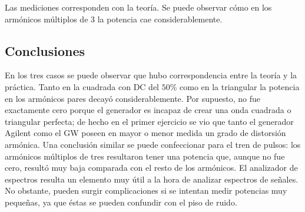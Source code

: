 Las mediciones corresponden con la teoría. Se puede observar cómo en los armónicos múltiplos de $3$ la potencia cae considerablemente.

\subsection{Conclusiones}

En los tres casos se puede observar que hubo correspondencia entre la teoría y la práctica. Tanto en la cuadrada con DC del $50\%$ como en la triangular la potencia en los armónicos pares decayó considerablemente. Por supuesto, no fue exactamente cero porque el generador es incapaz de crear una onda cuadrada o triangular perfecta; de hecho en el primer ejercicio se vio que tanto el generador Agilent como el GW poseen en mayor o menor medida un grado de distorsión armónica. Una conclusión similar se puede confeccionar para el tren de pulsos: los armónicos múltiplos de tres resultaron tener una potencia que, aunque no fue cero, resultó muy baja comparada con el resto de los armónicos. El analizador de espectros resulta un elemento muy útil a la hora de analizar espectros de señales. No obstante, pueden surgir complicaciones si se intentan medir potencias muy pequeñas, ya que éstas se pueden confundir con el piso de ruido.


